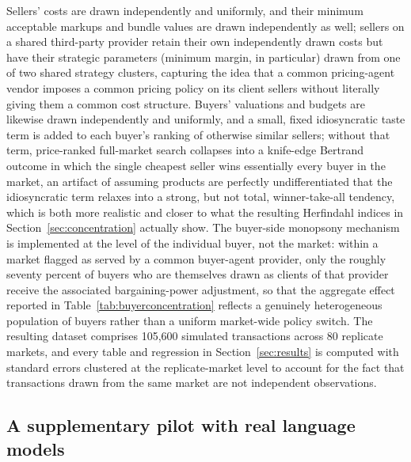 \documentclass[review]{elsarticle}
\begin{document}
Sellers' costs are drawn independently and uniformly, and their minimum acceptable markups and bundle values are drawn independently as well; sellers on a shared third-party provider retain their own independently drawn costs but have their strategic parameters (minimum margin, in particular) drawn from one of two shared strategy clusters, capturing the idea that a common pricing-agent vendor imposes a common pricing policy on its client sellers without literally giving them a common cost structure. Buyers' valuations and budgets are likewise drawn independently and uniformly, and a small, fixed idiosyncratic taste term is added to each buyer's ranking of otherwise similar sellers; without that term, price-ranked full-market search collapses into a knife-edge Bertrand outcome in which the single cheapest seller wins essentially every buyer in the market, an artifact of assuming products are perfectly undifferentiated that the idiosyncratic term relaxes into a strong, but not total, winner-take-all tendency, which is both more realistic and closer to what the resulting Herfindahl indices in Section~\ref{sec:concentration} actually show. The buyer-side monopsony mechanism is implemented at the level of the individual buyer, not the market: within a market flagged as served by a common buyer-agent provider, only the roughly seventy percent of buyers who are themselves drawn as clients of that provider receive the associated bargaining-power adjustment, so that the aggregate effect reported in Table~\ref{tab:buyerconcentration} reflects a genuinely heterogeneous population of buyers rather than a uniform market-wide policy switch. The resulting dataset comprises 105,600 simulated transactions across 80 replicate markets, and every table and regression in Section~\ref{sec:results} is computed with standard errors clustered at the replicate-market level to account for the fact that transactions drawn from the same market are not independent observations.

\subsection{A supplementary pilot with real language models}
\label{sec:methodology-llm}
\end{document}
